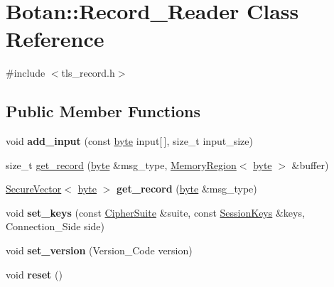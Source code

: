 \hypertarget{classBotan_1_1Record__Reader}{\section{Botan\-:\-:Record\-\_\-\-Reader Class Reference}
\label{classBotan_1_1Record__Reader}
}


{\ttfamily \#include $<$tls\-\_\-record.\-h$>$}

\subsection*{Public Member Functions}
\begin{DoxyCompactItemize}
\item 
\hypertarget{classBotan_1_1Record__Reader_a5557cca88b5038ce715271cc0f51c539}{void {\bfseries add\-\_\-input} (const \hyperlink{namespaceBotan_a7d793989d801281df48c6b19616b8b84}{byte} input\mbox{[}$\,$\mbox{]}, size\-\_\-t input\-\_\-size)}\label{classBotan_1_1Record__Reader_a5557cca88b5038ce715271cc0f51c539}

\item 
size\-\_\-t \hyperlink{classBotan_1_1Record__Reader_a2e67b2f3b7fbd01c83a3c9be28535c14}{get\-\_\-record} (\hyperlink{namespaceBotan_a7d793989d801281df48c6b19616b8b84}{byte} \&msg\-\_\-type, \hyperlink{classBotan_1_1MemoryRegion}{Memory\-Region}$<$ \hyperlink{namespaceBotan_a7d793989d801281df48c6b19616b8b84}{byte} $>$ \&buffer)
\item 
\hypertarget{classBotan_1_1Record__Reader_a0a898a90a50816083dc3215269ad5bed}{\hyperlink{classBotan_1_1SecureVector}{Secure\-Vector}$<$ \hyperlink{namespaceBotan_a7d793989d801281df48c6b19616b8b84}{byte} $>$ {\bfseries get\-\_\-record} (\hyperlink{namespaceBotan_a7d793989d801281df48c6b19616b8b84}{byte} \&msg\-\_\-type)}\label{classBotan_1_1Record__Reader_a0a898a90a50816083dc3215269ad5bed}

\item 
\hypertarget{classBotan_1_1Record__Reader_ae918aac13780abc4ba6658950b6300b2}{void {\bfseries set\-\_\-keys} (const \hyperlink{classBotan_1_1CipherSuite}{Cipher\-Suite} \&suite, const \hyperlink{classBotan_1_1SessionKeys}{Session\-Keys} \&keys, Connection\-\_\-\-Side side)}\label{classBotan_1_1Record__Reader_ae918aac13780abc4ba6658950b6300b2}

\item 
\hypertarget{classBotan_1_1Record__Reader_a52d78a4abfe962b4dd655926f988b126}{void {\bfseries set\-\_\-version} (Version\-\_\-\-Code version)}\label{classBotan_1_1Record__Reader_a52d78a4abfe962b4dd655926f988b126}

\item 
\hypertarget{classBotan_1_1Record__Reader_a133d23f431f025533f605bac1d4a7143}{void {\bfseries reset} ()}\label{classBotan_1_1Record__Reader_a133d23f431f025533f605bac1d4a7143}

\end{DoxyCompactItemize}


